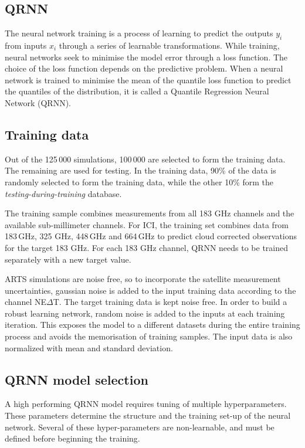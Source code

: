 \documentclass[amt, manuscript]{copernicus}
\begin{document}
\subsection{QRNN}

%
The neural network training is a process of learning to predict the outputs {$y_i$} from inputs {$x_i$} through a series of learnable transformations. While training, neural networks seek to minimise the model error through a loss function. The choice of the loss function depends on the predictive problem. When a neural network is trained to minimise the mean of the quantile loss function to predict the quantiles of the distribution, it is called a Quantile Regression Neural Network (QRNN). 



\subsection{Training data}

Out of the 125\,000 simulations, 100\,000 are selected to form the training data. The remaining are used for testing. In the training data, 90\% of the data is randomly selected to form the training data, while the other 10\% form the \textit{testing-during-training} database. 

The training sample combines measurements from all 183 GHz channels and the available sub-millimeter channels. For ICI, the training set combines data from 183\,GHz, 325 GHz, 448\,GHz and 664\,GHz to predict cloud corrected observations for the target 183 GHz. For each 183 GHz channel, QRNN needs to be trained separately with a new target value. 

ARTS simulations are noise free, so to incorporate the satellite measurement uncertainties, gaussian noise is added to the input training data according to the channel NE$\Delta$T. The target training data is kept noise free. In order to build a robust learning network, random noise is added to the inputs at each training iteration. This exposes the model to a different datasets during the entire training process and avoids the memorisation of training samples. The input data is also normalized with mean and standard deviation.

\subsection{QRNN model selection}

A high performing QRNN model requires tuning of multiple hyperparameters. These parameters determine the structure and the training set-up of the neural network. Several of these hyper-parameters are non-learnable, and must be defined before beginning the training.
\end{document}
